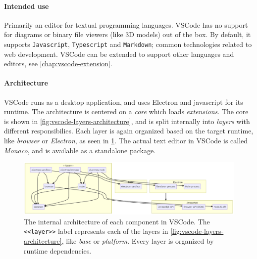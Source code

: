 \paragraph*{Intended use} Primarily an editor for textual programming languages.
VSCode has no support for diagrams or binary file viewers (like 3D models) out of the box. By default, it supports \texttt{Javascript}, \texttt{Typescript} and \texttt{Markdown}; common technologies related to web development.
VSCode can be extended to support other languages and editors, see \cref{chap:vscode-extension}.


\paragraph*{Architecture}
VSCode runs as a desktop application, and uses Electron and javascript for its runtime.
The architecture is centered on a \emph{core} which loads \emph{extensions}.
The core is shown in \cref{fig:vscode-layers-architecture}, and is split internally into \emph{layers} with different responsibilies.
Each layer is again organized based on the target runtime, like \emph{browser} or \emph{\gls{Electron}}, as seen in \cref{fig:vscode-component-architecture}.
The actual text editor in \gls{VSCode} is called \emph{Monaco}, and is available as a standalone package.~\cite{benjaminpaseroSourceCodeOrganization2020}


\begin{figure}[htbp]  %
  \centering
  \includegraphics[width=\textwidth]{figures/vscode-component-architecture}
  \caption[VSCode component Architecture]{The internal architecture of each component in VSCode. The \texttt{<<layer>>} label represents each of the layers in \cref{fig:vscode-layers-architecture}, like \emph{base} or \emph{platform}. Every layer is organized by runtime dependencies.~\cite{benjaminpaseroSourceCodeOrganization2020}}\label{fig:vscode-component-architecture}
\end{figure}

